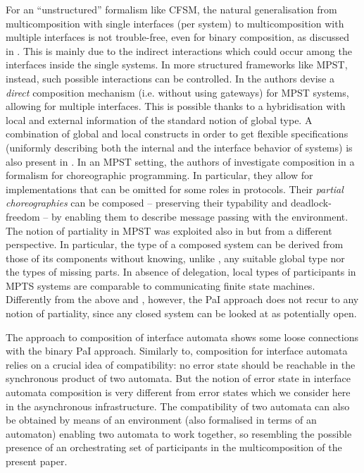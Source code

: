 For an ``unstructured'' formalism like CFSM,
the natural generalisation from multicomposition with
single interfaces (per system) to multicomposition with multiple interfaces is not trouble-free,
even for binary composition, as discussed in \cite[Sect.6]{BdLH19}.
This is mainly due to the indirect  interactions  which could occur  among the interfaces inside the single systems.
In more structured frameworks like MPST, instead, such possible interactions can be controlled. 
In \cite{GY23} the authors devise a  
 {\em  direct} composition mechanism (i.e.  without using gateways) for MPST systems,
 allowing for multiple interfaces. This is possible thanks to a hybridisation with local and external information of the standard notion of global type.  
A combination of global and local constructs in order to get flexible specifications
(uniformly describing both the internal and the interface behavior of systems) is also present in \cite{CV10}.
In an MPST setting, the authors of \cite{MY13} investigate composition in a formalism for choreographic programming. 
In particular, they allow for implementations that can
be omitted for some roles in protocols. Their {\em partial choreographies} can be composed
-- preserving their typability and deadlock-freedom --
by enabling them to describe message passing with the environment.
The notion of partiality in MPST was exploited also in \cite{SMG23} but from a different perspective.
In particular, the type of a composed system can be derived from those of its components without knowing, unlike \cite{MY13}, any suitable global type nor the types of missing parts.
In absence of delegation, local types of participants in MPTS systems  are comparable to communicating finite state machines. Differently from the above \cite{MY13} and \cite{SMG23}, however, the PaI approach does not recur to any notion of partiality, since any closed system can be looked at as potentially open.

The approach to composition of interface automata \cite{deAlfaro2001,deAlfaro2005} shows some loose connections with the binary PaI approach.
Similarly to\cite{BdLH19}, composition for interface automata relies on a crucial idea of compatibility: no error state should be reachable in the synchronous product of two automata. But the notion of error state in interface automata composition is very different from error states which we consider here in the asynchronous infrastructure.
The compatibility of two automata can also be obtained by means of an environment (also formalised 
in terms of an automaton) enabling two automata to work together, so resembling the possible presence of an orchestrating set of participants in the multicomposition of the present paper.

